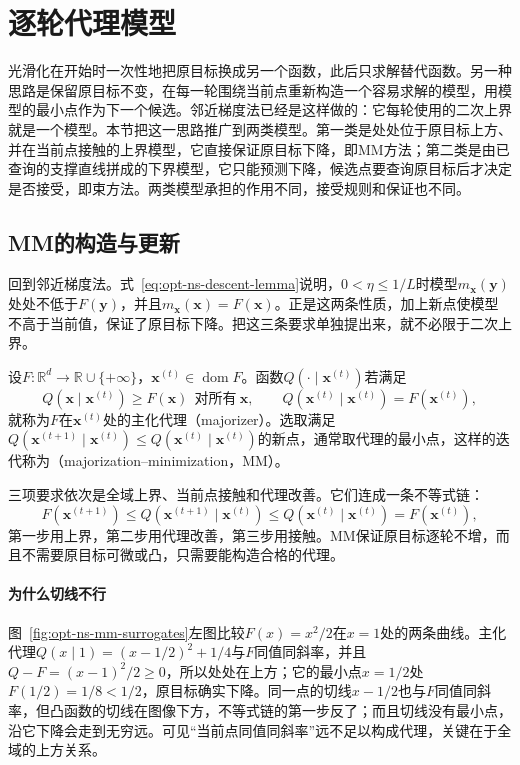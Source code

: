 \section{逐轮代理模型}
\label{sec:opt-ns-surrogates}

光滑化在开始时一次性地把原目标换成另一个函数，此后只求解替代函数。另一种思路是保留原目标不变，在每一轮围绕当前点重新构造一个容易求解的模型，用模型的最小点作为下一个候选。邻近梯度法已经是这样做的：它每轮使用的二次上界就是一个模型。本节把这一思路推广到两类模型。第一类是处处位于原目标上方、并在当前点接触的上界模型，它直接保证原目标下降，即MM方法；第二类是由已查询的支撑直线拼成的下界模型，它只能预测下降，候选点要查询原目标后才决定是否接受，即束方法。两类模型承担的作用不同，接受规则和保证也不同。

\subsection{MM的构造与更新}
\label{sec:opt-ns-mm}

回到邻近梯度法。式~\eqref{eq:opt-ns-descent-lemma}说明，$0<\eta\leq1/L$时模型$m_{\bm x}(\bm y)$处处不低于$F(\bm y)$，并且$m_{\bm x}(\bm x)=F(\bm x)$。正是这两条性质，加上新点使模型不高于当前值，保证了原目标下降。把这三条要求单独提出来，就不必限于二次上界。

\begin{definition}[主化代理与MM更新]
\label{def:opt-ns-mm}
设$F:\mathbb R^d\to\mathbb R\cup\{+\infty\}$，$\bm x^{(t)}\in\operatorname{dom}F$。函数$Q(\cdot\mid\bm x^{(t)})$若满足
\[
 Q(\bm x\mid\bm x^{(t)})\geq F(\bm x)\ \ \text{对所有}\ \bm x,\qquad Q(\bm x^{(t)}\mid\bm x^{(t)})=F(\bm x^{(t)}),
\]
就称为$F$在$\bm x^{(t)}$处的主化代理（majorizer）。选取满足$Q(\bm x^{(t+1)}\mid\bm x^{(t)})\leq Q(\bm x^{(t)}\mid\bm x^{(t)})$的新点，通常取代理的最小点，这样的迭代称为（majorization--minimization，MM）。
\end{definition}

三项要求依次是全域上界、当前点接触和代理改善。它们连成一条不等式链：
\begin{equation}
 F(\bm x^{(t+1)})\leq Q(\bm x^{(t+1)}\mid\bm x^{(t)})\leq Q(\bm x^{(t)}\mid\bm x^{(t)})=F(\bm x^{(t)}),
 \label{eq:opt-ns-mm-chain}
\end{equation}
第一步用上界，第二步用代理改善，第三步用接触。MM保证原目标逐轮不增，而且不需要原目标可微或凸，只需要能构造合格的代理。

\paragraph{为什么切线不行}
图~\ref{fig:opt-ns-mm-surrogates}左图比较$F(x)=x^2/2$在$x=1$处的两条曲线。主化代理$Q(x\mid1)=(x-1/2)^2+1/4$与$F$同值同斜率，并且$Q-F=(x-1)^2/2\geq0$，所以处处在上方；它的最小点$x=1/2$处$F(1/2)=1/8<1/2$，原目标确实下降。同一点的切线$x-1/2$也与$F$同值同斜率，但凸函数的切线在图像下方，不等式链的第一步反了；而且切线没有最小点，沿它下降会走到无穷远。可见“当前点同值同斜率”远不足以构成代理，关键在于全域的上方关系。

